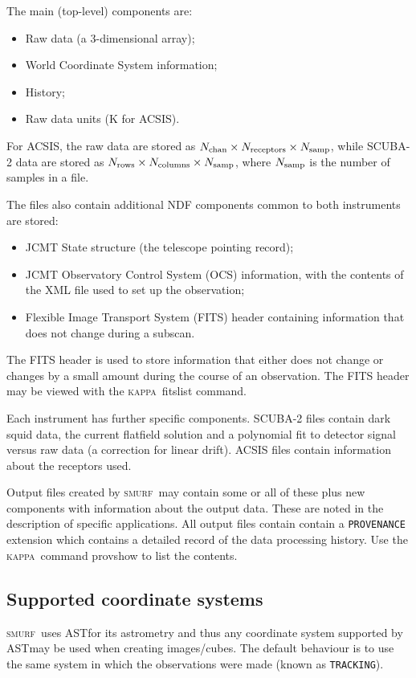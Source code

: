 \documentclass[twoside,11pt]{article}
\newcommand{\xref}[3]{#1}
\renewcommand{\_}{\texttt{\symbol{95}}}
\newcommand{\KAPPA}{\textsc{kappa}}
\newcommand{\SMURF}{\textsc{smurf}}
\newcommand{\AST}{\xref{AST}{sun210}}
\begin{document}
The main (top-level) components are:
\begin{itemize}
\item Raw data (a 3-dimensional array);
\item World Coordinate System information;
\item History;
\item Raw data units (K for ACSIS).
\end{itemize}
For ACSIS, the raw data are stored as $N_{\rm chan} \times N_{\rm
  receptors} \times N_{\rm samp}$, while SCUBA-2 data are stored as
$N_{\rm rows} \times N_{\rm columns} \times N_{\rm samp}$, where
$N_{\rm samp}$ is the number of samples in a file.

The files also contain additional NDF components common to both
instruments are stored:
\begin{itemize}
\item JCMT State structure (the telescope pointing record);
\item JCMT Observatory Control System (OCS) information, with the
  contents of the XML file used to set up the observation;
\item Flexible Image Transport System (FITS) header containing
  information that does not change during a subscan.
\end{itemize}
The FITS header is used to store information that either does not
change or changes by a small amount during the course of an
observation. The FITS header may be viewed with the \KAPPA\ fitslist
command.

Each instrument has further specific components. SCUBA-2 files contain
dark squid data, the current flatfield solution and a polynomial fit
to detector signal versus raw data (a correction for linear drift).
ACSIS files contain information about the receptors used.

Output files created by \SMURF\ may contain some or all of these plus
new components with information about the output data. These are noted
in the description of specific applications. All output files contain
contain a \texttt{PROVENANCE} extension which contains a detailed
record of the data processing history. Use the \KAPPA\ command
provshow to list the contents.

\subsection{Supported coordinate systems}

\SMURF\ uses \AST\ for its astrometry and thus any coordinate system
supported by \AST\ may be used when creating images/cubes. The default
behaviour is to use the same system in which the observations were
made (known as \texttt{TRACKING}).
\end{document}
